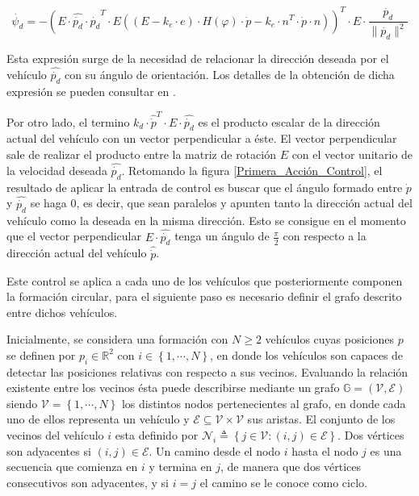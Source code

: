 \begin{equation}\label{Orientacion_deseada}
\dot{\psi_{d}}=-\left(E\cdot\hat{\dot{p_d}}\cdot{\hat{\dot{p_{d}}}^{T}}\cdot{E}\left(\left(E-k_{e}\cdot{e}\right)\cdot{H\left(\varphi\right)}\cdot{\dot{p}}-k_{e}\cdot{n^T}\cdot{\dot{p}}\cdot{n}\right)\right)^{T}\cdot{E}\cdot{\frac{\dot{p_d}}{\|\dot{p_{d}}\|^{2}}}
\end{equation}

Esta expresión surge de la necesidad de relacionar la dirección deseada por el vehículo $\hat{\dot{p_{d}}}$ con su ángulo de orientación. Los detalles de la obtención de dicha expresión se pueden consultar en \cite{Base_Coorporativa}.

Por otro lado, el termino $k_{d}\cdot{\hat{\dot{p}}^{T}}\cdot{E}\cdot{\hat{\dot{p_{d}}}}$ es el producto escalar de la dirección actual del vehículo con un vector perpendicular a éste. El vector perpendicular sale de realizar el producto entre la matriz de rotación $E$ con el vector unitario de la velocidad deseada $\hat{\dot{p_{d}}}$.
\newpage
Retomando la figura \ref{Primera_Acción_Control}, el resultado de aplicar la entrada de control es buscar que el ángulo formado entre $\dot{p}$ y $\hat{\dot{p_d}}$ se haga 0, es decir, que sean paralelos y apunten tanto la dirección actual del vehículo como la deseada en la misma dirección. Esto se consigue en el momento que el vector perpendicular ${E}\cdot{\hat{\dot{p_{d}}}}$ tenga un ángulo de $\frac{\pi}{2}$ con respecto a la dirección actual del vehículo $\hat{\dot{p}}$.

Este control se aplica a cada uno de los vehículos que posteriormente componen la formación circular,  para el siguiente paso es necesario definir el grafo descrito entre dichos vehículos.

Inicialmente, se considera una formación con $N\geq{2}$ vehículos cuyas posiciones $p$ se definen por $p_i\in\mathbb{R}^2$ con $i\in\left\lbrace{1,\cdots,N}\right\rbrace$, en donde los vehículos son capaces de detectar las posiciones relativas con respecto a sus vecinos. Evaluando la relación existente entre los vecinos ésta puede describirse mediante un grafo $\mathbb{G}=\left(\mathcal{V},\mathcal{E}\right)$ siendo $\mathcal{V}=\left\lbrace{1,\cdots,N}\right\rbrace$ los distintos nodos pertenecientes al grafo, en donde cada uno de ellos representa un vehículo y $\mathcal{E}\subseteq\mathcal{V}\times\mathcal{V}$ sus aristas. El conjunto de los vecinos del vehículo $i$ esta definido por $\mathcal{N}_i\triangleq\left\lbrace{j\in\mathcal{V}:\left(i,j\right)\in\mathcal{E}}\right\rbrace$. Dos vértices son adyacentes si $\left(i,j\right)\in\mathcal{E}$. Un camino desde el nodo $i$ hasta el nodo $j$ es una secuencia que comienza en $i$ y termina en $j$, de manera que dos vértices consecutivos son adyacentes, y si $i=j$ el camino se le conoce como ciclo. \cite{Control_Formacion}

